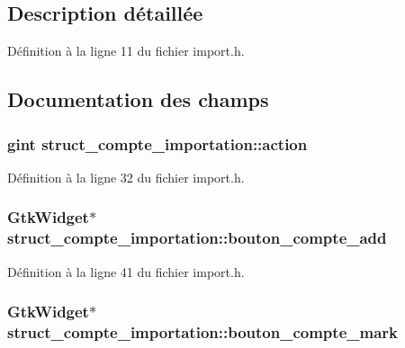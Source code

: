 \subsection{Description détaillée}


Définition à la ligne 11 du fichier import.h.



\subsection{Documentation des champs}
\subsubsection[{action}]{\setlength{\rightskip}{0pt plus 5cm}gint {\bf struct\_\-compte\_\-importation::action}}\label{structstruct__compte__importation_a0393a47e80bf0f244d22c17c20be31c6}


Définition à la ligne 32 du fichier import.h.

\subsubsection[{bouton\_\-compte\_\-add}]{\setlength{\rightskip}{0pt plus 5cm}GtkWidget$\ast$ {\bf struct\_\-compte\_\-importation::bouton\_\-compte\_\-add}}\label{structstruct__compte__importation_aae36436487430bfade72e24031f2feb0}


Définition à la ligne 41 du fichier import.h.

\subsubsection[{bouton\_\-compte\_\-mark}]{\setlength{\rightskip}{0pt plus 5cm}GtkWidget$\ast$ {\bf struct\_\-compte\_\-importation::bouton\_\-compte\_\-mark}}\label{structstruct__compte__importation_aa29a9309c5ed724e203778ef76f4d5d5}


